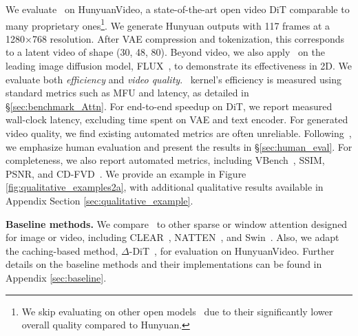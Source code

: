 





We evaluate \methodnameshort~on HunyuanVideo, a state-of-the-art open video DiT comparable to many proprietary ones\footnote{We skip evaluating on other open models~\cite{lin2024open, opensora, ma2024latte} due to their significantly lower overall quality compared to Hunyuan.}.
We generate Hunyuan outputs with 117 frames at a 1280×768 resolution. After VAE compression and tokenization, this corresponds to a latent video of shape (30, 48, 80). Beyond video, we also apply \methodnameshort~on the leading image diffusion model, FLUX~\citep{flux2023}, to demonstrate its effectiveness in 2D.
We evaluate both \emph{efficiency} and \emph{video quality}. 
\methodnameshort~kernel’s efficiency is measured using standard metrics such as MFU and latency, as detailed in \S\ref{sec:benchmark_Attn}. For end-to-end speedup on DiT, we report measured wall-clock latency, excluding time spent on VAE and text encoder.
For generated video quality, we find existing automated metrics are often unreliable. Following~\citet{polyak2024movie}, we emphasize human evaluation and present the results in  \S\ref{sec:human_eval}. For completeness, we also report automated metrics, including VBench~\citep{huang2024vbench}, SSIM, PSNR, and CD-FVD~\citep{ge2024contentbiasfrechetvideo}. 
We provide an example in Figure \ref{fig:qualitative_examples2a}, with additional qualitative results available in Appendix Section \ref{sec:qualitative_example}.


\noindent \textbf{Baseline methods.}
We compare \methodnameshort~to other sparse or window attention designed for image or video, including CLEAR~\citep{liu2024clearconvlikelinearizationrevs}, NATTEN~\cite{hassani2023neighborhood}, and Swin~\citep{liu2021swintransformerhierarchicalvision}. Also, we adapt the caching-based method, $\Delta$-DiT~\citep{chen2024delta}, for evaluation on HunyuanVideo. Further details on the baseline methods and their implementations can be found in Appendix \ref{sec:baseline}.

